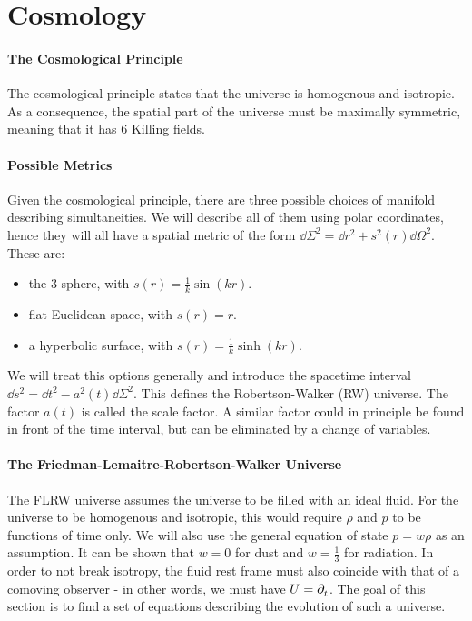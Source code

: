 \section{Cosmology}

\paragraph{The Cosmological Principle}
The cosmological principle states that the universe is homogenous and isotropic. As a consequence, the spatial part of the universe must be maximally symmetric, meaning that it has $6$ Killing fields.

\paragraph{Possible Metrics}
Given the cosmological principle, there are three possible choices of manifold describing simultaneities. We will describe all of them using polar coordinates, hence they will all have a spatial metric of the form $\dd{\Sigma}^{2} = \dd{r}^{2} + s^{2}(r)\dd{\Omega}^{2}$. These are:
\begin{itemize}
	\item the $3$-sphere, with $s(r) = \frac{1}{k}\sin(kr)$.
	\item flat Euclidean space, with $s(r) = r$.
	\item a hyperbolic surface, with $s(r) = \frac{1}{k}\sinh(kr)$.
\end{itemize}

We will treat this options generally and introduce the spacetime interval $\dd{s}^{2} = \dd{t}^{2} - a^{2}(t)\dd{\Sigma}^{2}$. This defines the Robertson-Walker (RW) universe. The factor $a(t)$ is called the scale factor. A similar factor could in principle be found in front of the time interval, but can be eliminated by a change of variables.

\paragraph{The Friedman-Lemaitre-Robertson-Walker Universe}
The FLRW universe assumes the universe to be filled with an ideal fluid. For the universe to be homogenous and isotropic, this would require $\rho$ and $p$ to be functions of time only. We will also use the general equation of state $p = w\rho$ as an assumption. It can be shown that $w = 0$ for dust and $w = \frac{1}{3}$ for radiation. In order to not break isotropy, the fluid rest frame must also coincide with that of a comoving observer - in other words, we must have $U = \partial^{}_{t}$. The goal of this section is to find a set of equations describing the evolution of such a universe.


